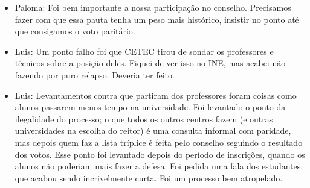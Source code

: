 \documentclass{ata-calico}
\begin{document}
\begin{itemize}
\item Paloma: Foi bem importante a nossa participação no conselho. Precisamos fazer com que essa pauta tenha um peso mais histórico, insistir no ponto até que consigamos o voto paritário.
\item Luis: Um ponto falho foi que CETEC tirou de sondar os professores e técnicos sobre a posição deles. Fiquei de ver isso no INE, mas acabei não fazendo por puro relapso. Deveria ter feito.
\item Luis: Levantamentos contra que partiram dos professores foram coisas como alunos passarem menos tempo na universidade. Foi levantado o ponto da ilegalidade do processo; o que todos os outros centros fazem (e outras universidades na escolha do reitor) é uma consulta informal com paridade, mas depois quem faz a lista tríplice é feita pelo conselho seguindo o resultado dos votos. Esse ponto foi levantado depois do período de inscrições, quando os alunos não poderiam mais fazer a defesa. Foi pedida uma fala dos estudantes, que acabou sendo incrivelmente curta. Foi um processo bem atropelado.
\end{itemize}
\end{document}

